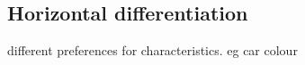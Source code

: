 
\subsection{Horizontal differentiation}

different preferences for characteristics. eg car colour

